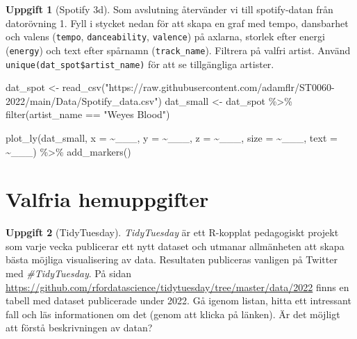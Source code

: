 \documentclass[
]{book}
\newenvironment{Shaded}{\begin{snugshade}}{\end{snugshade}}
\newcommand{\AttributeTok}[1]{\textcolor[rgb]{0.77,0.63,0.00}{#1}}
\newcommand{\FunctionTok}[1]{\textcolor[rgb]{0.00,0.00,0.00}{#1}}
\newcommand{\NormalTok}[1]{#1}
\newcommand{\OtherTok}[1]{\textcolor[rgb]{0.56,0.35,0.01}{#1}}
\newcommand{\SpecialCharTok}[1]{\textcolor[rgb]{0.00,0.00,0.00}{#1}}
\newcommand{\StringTok}[1]{\textcolor[rgb]{0.31,0.60,0.02}{#1}}
\theoremstyle{definition}
\theoremstyle{definition}
\theoremstyle{definition}
\newtheorem{exercise}{Uppgift}[chapter]
\theoremstyle{definition}
\theoremstyle{remark}
\begin{document}
\begin{exercise}[Spotify 3d]

Som avslutning återvänder vi till spotify-datan från datorövning 1. Fyll i stycket nedan för att skapa en graf med tempo, dansbarhet och valens (\texttt{tempo}, \texttt{danceability}, \texttt{valence}) på axlarna, storlek efter energi (\texttt{energy}) och text efter spårnamn (\texttt{track\_name}). Filtrera på valfri artist. Använd \texttt{unique(dat\_spot\$artist\_name)} för att se tillgängliga artister.

\begin{Shaded}
\begin{Highlighting}[]
\NormalTok{dat\_spot }\OtherTok{\textless{}{-}} \FunctionTok{read\_csv}\NormalTok{(}\StringTok{"https://raw.githubusercontent.com/adamflr/ST0060{-}2022/main/Data/Spotify\_data.csv"}\NormalTok{)}
\NormalTok{dat\_small }\OtherTok{\textless{}{-}}\NormalTok{ dat\_spot }\SpecialCharTok{\%\textgreater{}\%} \FunctionTok{filter}\NormalTok{(artist\_name }\SpecialCharTok{==} \StringTok{"Weyes Blood"}\NormalTok{)}

\FunctionTok{plot\_ly}\NormalTok{(dat\_small, }\AttributeTok{x =} \SpecialCharTok{\textasciitilde{}}\NormalTok{\_\_\_, }\AttributeTok{y =} \SpecialCharTok{\textasciitilde{}}\NormalTok{\_\_\_, }\AttributeTok{z =} \SpecialCharTok{\textasciitilde{}}\NormalTok{\_\_\_, }\AttributeTok{size =} \SpecialCharTok{\textasciitilde{}}\NormalTok{\_\_\_, }\AttributeTok{text =} \SpecialCharTok{\textasciitilde{}}\NormalTok{\_\_\_) }\SpecialCharTok{\%\textgreater{}\%} 
  \FunctionTok{add\_markers}\NormalTok{()}
\end{Highlighting}
\end{Shaded}

\end{exercise}

\hypertarget{valfria-hemuppgifter-1}{%
\section{Valfria hemuppgifter}\label{valfria-hemuppgifter-1}}

\begin{exercise}[TidyTuesday]
\emph{TidyTuesday} är ett R-kopplat pedagogiskt projekt som varje vecka publicerar ett nytt dataset och utmanar allmänheten att skapa bästa möjliga visualisering av data. Resultaten publiceras vanligen på Twitter med \emph{\#TidyTuesday}. På sidan
\url{https://github.com/rfordatascience/tidytuesday/tree/master/data/2022}
finns en tabell med dataset publicerade under 2022. Gå igenom listan, hitta ett intressant fall och läs informationen om det (genom att klicka på länken). Är det möjligt att förstå beskrivningen av datan?
\end{exercise}
\end{document}
